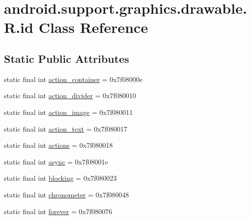 \hypertarget{classandroid_1_1support_1_1graphics_1_1drawable_1_1_r_1_1id}{}\section{android.\+support.\+graphics.\+drawable.\+R.\+id Class Reference}
\label{classandroid_1_1support_1_1graphics_1_1drawable_1_1_r_1_1id}
\subsection*{Static Public Attributes}
\begin{DoxyCompactItemize}
\item 
static final int \mbox{\hyperlink{classandroid_1_1support_1_1graphics_1_1drawable_1_1_r_1_1id_a30932d97517388e9666277c886f33d52}{action\+\_\+container}} = 0x7f08000e
\item 
static final int \mbox{\hyperlink{classandroid_1_1support_1_1graphics_1_1drawable_1_1_r_1_1id_a9266e81cdb75c20cecd21e7390ea377b}{action\+\_\+divider}} = 0x7f080010
\item 
static final int \mbox{\hyperlink{classandroid_1_1support_1_1graphics_1_1drawable_1_1_r_1_1id_a08713a5c478ae6b3e142e63ef9a8c788}{action\+\_\+image}} = 0x7f080011
\item 
static final int \mbox{\hyperlink{classandroid_1_1support_1_1graphics_1_1drawable_1_1_r_1_1id_a59b447ee33c712fe3be6c44ba8d30add}{action\+\_\+text}} = 0x7f080017
\item 
static final int \mbox{\hyperlink{classandroid_1_1support_1_1graphics_1_1drawable_1_1_r_1_1id_aa0d8db26164bce410f39c9ad39fc25b1}{actions}} = 0x7f080018
\item 
static final int \mbox{\hyperlink{classandroid_1_1support_1_1graphics_1_1drawable_1_1_r_1_1id_a5216cd03a2ef71262b45065d497732ee}{async}} = 0x7f08001e
\item 
static final int \mbox{\hyperlink{classandroid_1_1support_1_1graphics_1_1drawable_1_1_r_1_1id_a660f8c1a84df705acdd2194d63a27dc4}{blocking}} = 0x7f080023
\item 
static final int \mbox{\hyperlink{classandroid_1_1support_1_1graphics_1_1drawable_1_1_r_1_1id_a336ddf79e77d986bd0841b334eed2fad}{chronometer}} = 0x7f080048
\item 
static final int \mbox{\hyperlink{classandroid_1_1support_1_1graphics_1_1drawable_1_1_r_1_1id_a67c3d78718f2d53cffb600a5cbeb4392}{forever}} = 0x7f080076
\item 

\end{DoxyCompactItemize}
